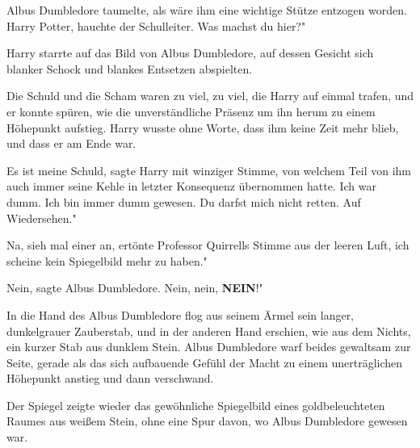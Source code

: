 Albus Dumbledore taumelte, als wäre ihm eine wichtige Stütze entzogen worden.
\glqq{}Harry Potter\grqq{}, hauchte der Schulleiter. \glqq{}Was machst du hier?"

Harry starrte auf das Bild von Albus Dumbledore, auf dessen Gesicht sich blanker
Schock und blankes Entsetzen abspielten.

Die Schuld und die Scham waren zu viel, zu viel, die Harry auf einmal trafen,
und er konnte spüren, wie die unverständliche Präsenz um ihn herum zu einem
Höhepunkt aufstieg. Harry wusste ohne Worte, dass ihm keine Zeit mehr blieb, und
dass er am Ende war.

\glqq{}Es ist meine Schuld\grqq{}, sagte Harry mit winziger Stimme, von welchem
Teil von ihm auch immer seine Kehle in letzter Konsequenz übernommen hatte.
\glqq{}Ich war dumm. Ich bin immer dumm gewesen. Du darfst mich nicht retten. Auf
Wiedersehen."

\glqq{}Na, sieh mal einer an\grqq{}, ertönte Professor Quirrells Stimme aus der
leeren Luft, \glqq{}ich scheine kein Spiegelbild mehr zu haben."

\glqq{}Nein\grqq{}, sagte Albus Dumbledore. \glqq{}Nein, nein, \textbf{NEIN}!"

In die Hand des Albus Dumbledore flog aus seinem Ärmel sein langer, dunkelgrauer
Zauberstab, und in der anderen Hand erschien, wie aus dem Nichts, ein kurzer
Stab aus dunklem Stein. Albus Dumbledore warf beides gewaltsam zur Seite, gerade
als das sich aufbauende Gefühl der Macht zu einem unerträglichen Höhepunkt
anstieg und dann verschwand.

Der Spiegel zeigte wieder das gewöhnliche Spiegelbild eines goldbeleuchteten
Raumes aus weißem Stein, ohne eine Spur davon, wo Albus Dumbledore gewesen war.

